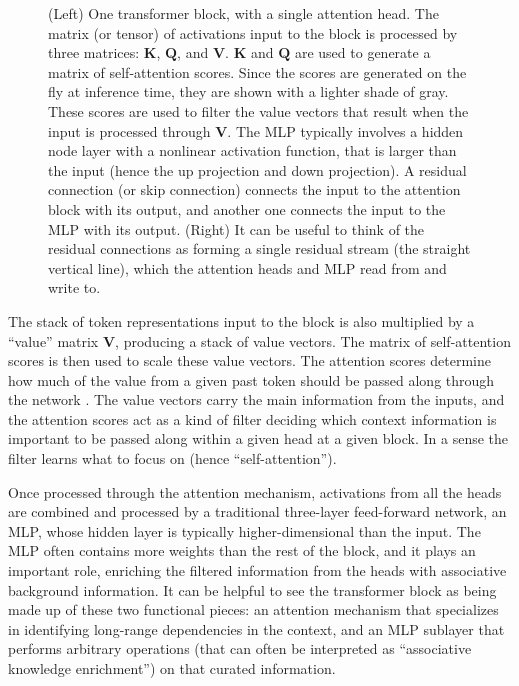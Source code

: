 \begin{figure}[ht]
\centering
{}
\caption[Jeff Yoshimi and Pierre Beckmann, with consultation from Tim Meyer.]{(Left) One transformer
block, with a single attention head. The matrix (or tensor) of activations input to
the block is processed by three matrices: $\textbf{K}$, $\textbf{Q}$, and
$\textbf{V}$.  $\textbf{K}$ and $\textbf{Q}$ are used to generate a
matrix of self-attention scores. Since the scores are generated on the fly at inference time, they are shown with a lighter shade of gray. These scores are used to filter the value vectors that result when the input is processed through $\textbf{V}$. The MLP
typically involves a hidden node layer with a nonlinear activation function, that is larger than the input (hence the up
projection and down projection). A residual connection (or skip connection) connects the input to the attention block with its output, and another one connects the input to the MLP with its output. (Right) It can be useful to think of the residual connections as forming a single residual stream (the straight vertical line), which the attention heads and MLP read from and write to.}
\label{transformerBlockSimple}
\end{figure}

The stack of token representations input to the block is also multiplied by a ``value'' matrix $\textbf{V}$, producing a stack of value vectors. The matrix of self-attention scores is then used to scale these value vectors. The attention scores determine how much of the value from a given past token should be passed along through the network \cite{beckmann2025mechanistic}. The value vectors carry the main information from the inputs, and the attention scores act as a kind of filter deciding which context information is important to be passed along within a given head at a given block. In a sense the filter learns what to focus on (hence ``self-attention'').

Once processed through the attention mechanism, activations from all the heads are combined and processed by a
traditional three-layer feed-forward network, an MLP, whose hidden layer is typically higher-dimensional than the input.  The MLP often contains more
weights than the rest of the block, and it plays an important role, enriching the filtered information from the heads with associative background information. It can be helpful to see the transformer
block as being made up of these two functional pieces: an
attention mechanism that specializes in identifying long-range dependencies in the
context, and an MLP sublayer that performs arbitrary operations (that can often be interpreted as ``associative knowledge enrichment'') on that curated information.  

